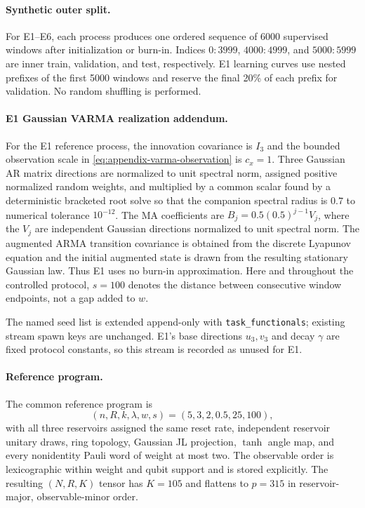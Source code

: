 \paragraph{Synthetic outer split.}
For E1--E6, each process produces one ordered sequence of 6000 supervised
windows after initialization or burn-in.  Indices \(0{:}3999\),
\(4000{:}4999\), and \(5000{:}5999\) are inner train, validation, and test,
respectively.  E1 learning curves use nested prefixes of the first 5000
windows and reserve the final 20\% of each prefix for validation.  No random
shuffling is performed.

\paragraph{E1 Gaussian VARMA realization addendum.}
For the E1 reference process, the innovation covariance is \(I_3\) and the
bounded observation scale in \cref{eq:appendix-varma-observation} is
\(c_x=1\). Three Gaussian AR matrix directions are normalized to unit
spectral norm, assigned positive normalized random weights, and multiplied by
a common scalar found by a deterministic bracketed root solve so that the
companion spectral radius is \(0.7\) to numerical tolerance \(10^{-12}\).
The MA coefficients are \(B_j=0.5(0.5)^{j-1}V_j\), where the \(V_j\) are
independent Gaussian directions normalized to unit spectral norm. The
augmented ARMA transition covariance is obtained from the discrete Lyapunov
equation and the initial augmented state is drawn from the resulting stationary
Gaussian law. Thus E1 uses no burn-in approximation. Here and throughout the
controlled protocol, \(s=100\) denotes the distance between consecutive window
endpoints, not a gap added to \(w\).

The named seed list is extended append-only with
\texttt{task\_functionals}; existing stream spawn keys are unchanged. E1's
base directions \(u_3,v_3\) and decay \(\gamma\) are fixed protocol constants,
so this stream is recorded as unused for E1.

\paragraph{Reference program.}
The common reference program is
\[
 (n,R,k,\lambda,w,s)=(5,3,2,0.5,25,100),
\]
with all three reservoirs assigned the same reset rate, independent reservoir
unitary draws, ring topology, Gaussian JL projection, \(\tanh\) angle map,
and every nonidentity Pauli word of weight at most two.  The observable order is
lexicographic within weight and qubit support and is stored explicitly.  The
resulting \((N,R,K)\) tensor has \(K=105\) and flattens to \(p=315\) in
reservoir-major, observable-minor order.

